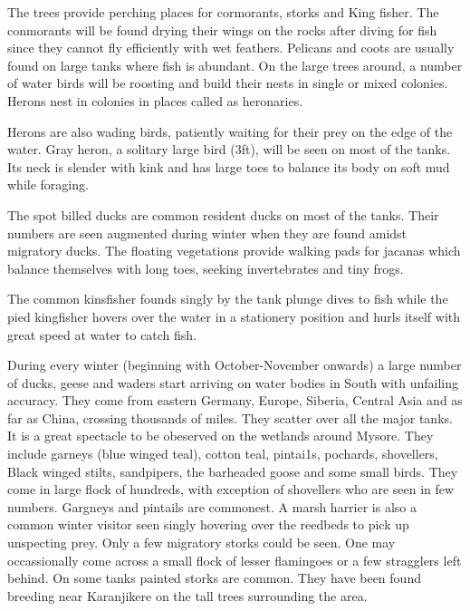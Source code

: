 The trees provide perching places for cormorants, storks 
and King fisher. The conmorants will be found drying their 
wings on the rocks after diving for fish since they cannot 
fly efficiently with wet feathers. Pelicans and coots are 
usually found on large tanks where fish is abundant. On the 
large trees around, a number of water birds will be roosting 
and build their nests in single or mixed colonies. Herons 
nest in colonies in places called as heronaries. 

Herons are also wading birds, patiently waiting for 
their prey on the edge of the water. Gray heron, a 
solitary large bird (3ft), will be seen on most of the tanks. 
Its neck is slender with kink and has large toes to balance 
its body on soft mud while foraging. 

The spot billed ducks are common resident ducks on most 
of the tanks. Their numbers are seen augmented during winter 
when they are found amidst migratory ducks. The floating 
vegetations provide walking pads for jacanas which balance 
themselves with long toes, seeking invertebrates and tiny 
frogs. 

The common kinsfisher founds singly by the tank plunge 
dives to fish while the pied kingfisher hovers over the water 
in a stationery position and hurls itself with great speed at 
water to catch fish. 


\smallskip
\bigskip
\noindent
{} 

During every winter (beginning with October-November 
onwards) a large number of ducks, geese and waders start 
arriving on water bodies in South with unfailing accuracy. 
They come from eastern Germany, Europe, Siberia, Central Asia 
and as far as China, crossing thousands of miles. They 
scatter over all the major tanks. It is a great spectacle to 
be obeserved on the wetlands around Mysore. They include 
garneys (blue winged teal), cotton teal, pintai1s, 
pochards, shovellers, Black winged stilts, sandpipers, the 
barheaded goose and some small birds. They come in large 
flock of hundreds, with exception of shovellers who are seen 
in few numbers. Gargneys and pintails are commonest. A 
marsh harrier is also a common winter visitor seen singly 
hovering over the reedbeds to pick up unspecting prey. Only 
a few migratory storks could be seen. One may occassionally 
come across a small flock of lesser flamingoes  or a few 
stragglers left behind. On some tanks painted storks are 
common. They have been found breeding near Karanjikere on the tall 
trees surrounding the area. 

